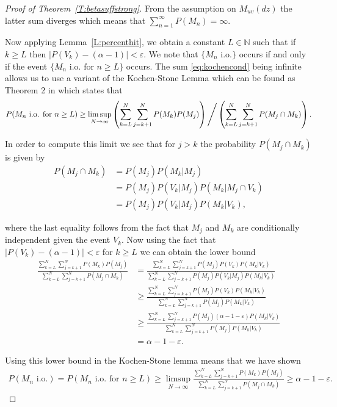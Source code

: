 \documentclass[11pt]{article}
\theoremstyle{definition}
\newcommand{\N}{\mathbb{N}}
\newcommand{\thmref}[1]{Theorem~\ref{T:#1}}
\newcommand{\lemref}[1]{Lemma~\ref{L:#1}}
\begin{document}
\begin{proof}[Proof of \thmref{betasuffstrong}]
    \noindent From the assumption on $M_{uv}(dz)$ the latter sum diverges which means that $\sum_{n = 1}^\infty P(M_n) = \infty$.
    \medskip
    
    \noindent Now applying \lemref{percenthit}, we obtain a constant $L \in \N$ such that if $k \geq L$ then $|P(V_k) - (\alpha - 1)| < \varepsilon$. We note that $\{M_n \text{ i.o.}\}$ occurs if and only if the event $\{M_n \text{ i.o. for $n \geq L$}\}$ occurs. The sum \eqref{eq:kochencond} being infinite allows us to use a variant of the Kochen-Stone Lemma which can be found as Theorem 2 in \cite{Yan2006} which states that
    \begin{align*}
        P(M_n \text{ i.o. for $n \geq L$}) \geq \limsup_{N \to \infty}\left(\sum_{k = L}^N\sum_{j = k+1}^N P(M_k)P(M_j) \right)\Bigg{/}\left(\sum_{k = L}^N\sum_{j = k+1}^N P(M_j \cap  M_k)\right).
    \end{align*}

    \noindent In order to compute this limit we see that for $j > k$ the probability $P(M_j \cap M_k)$ is given by
    \begin{align*}
        P(M_j \cap M_k) &=P(M_j)P(M_k |M_j) \\
        &= P(M_j)P(V_k |M_j)P(M_k |M_j \cap V_k) \\
        &=P(M_j)P(V_k |M_j)P(M_k |V_k),
    \end{align*}

    \noindent where the last equality follows from the fact that $M_j$ and $M_k$ are conditionally independent given the event $V_k$. Now using the fact that $|P(V_k) - (\alpha - 1)| < \varepsilon$ for $k \geq L$ we can obtain the lower bound
    \begin{align*}
        \frac{\sum_{k = L}^N\sum_{j = k+1}^N P(M_k)P(M_j)}{\sum_{k = L}^N\sum_{j = k+1}^N P(M_j \cap  M_k)} &= \frac{\sum_{k = L}^N\sum_{j = k+1}^N P(M_j)P(V_k)P(M_k|V_k)}{\sum_{k = L}^N\sum_{j = k+1}^N P(M_j)P(V_k |M_j)P(M_k |V_k)} \\
        &\geq \frac{\sum_{k = L}^N\sum_{j = k+1}^N P(M_j)P(V_k)P(M_k|V_k)}{\sum_{k = L}^N\sum_{j = k+1}^N P(M_j)P(M_k |V_k)} \\
        &\geq \frac{\sum_{k = L}^N\sum_{j = k+1}^N P(M_j)(\alpha - 1 - \varepsilon)P(M_k|V_k)}{\sum_{k = L}^N\sum_{j = k+1}^N P(M_j)P(M_k |V_k)} \\
        &= \alpha -1 - \varepsilon.
    \end{align*}
    
    \noindent Using this lower bound in the Kochen-Stone lemma means that we have shown
    \begin{align*}
        P(M_n \text{ i.o.})= P(M_n \text{ i.o. for $n \geq L$}) \geq \limsup_{N \to \infty}\frac{\sum_{k = L}^N\sum_{j = k+1}^N P(M_k)P(M_j)}{\sum_{k = L}^N\sum_{j = k+1}^N P(M_j \cap  M_k)} \geq \alpha -1 -\varepsilon.
    \end{align*}


\end{proof}
\end{document}
